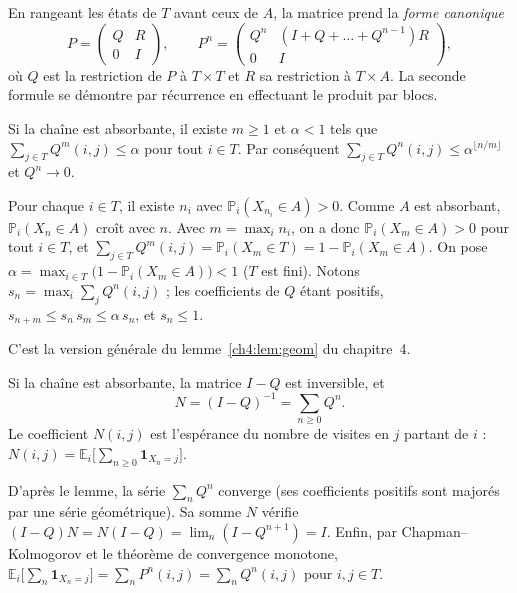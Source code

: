 En rangeant les états de $T$ avant ceux de $A$, la matrice prend la \emph{forme canonique}
\[P=\begin{pmatrix}Q&R\\0&I\end{pmatrix},\qquad P^n=\begin{pmatrix}Q^n&(I+Q+\dots+Q^{n-1})R\\0&I\end{pmatrix},\]
où $Q$ est la restriction de $P$ à $T\times T$ et $R$ sa restriction à $T\times A$. La seconde formule se démontre par
récurrence en effectuant le produit par blocs.

\begin{lemma}\label{appB:lem:geom}
Si la chaîne est absorbante, il existe $m\ge1$ et $\alpha<1$ tels que $\sum_{j\in T}Q^m(i,j)\le\alpha$ pour tout $i\in
T$. Par conséquent $\sum_{j\in T}Q^n(i,j)\le\alpha^{\lfloor n/m\rfloor}$ et $Q^n\to0$.
\end{lemma}

\begin{humanproof}
Pour chaque $i\in T$, il existe $n_i$ avec $\mathbb P_i(X_{n_i}\in A)>0$. Comme $A$ est absorbant, $\mathbb P_i(X_n\in
A)$ croît avec $n$. Avec $m=\max_in_i$, on a donc $\mathbb P_i(X_m\in A)>0$ pour tout $i\in T$, et
$\sum_{j\in T}Q^m(i,j)=\mathbb P_i(X_m\in T)=1-\mathbb P_i(X_m\in A)$. On pose $\alpha=\max_{i\in T}\bigl(1-\mathbb P_i(X_m\in
A)\bigr)<1$ ($T$ est fini). Notons $s_n=\max_i\sum_jQ^n(i,j)$ ; les coefficients de $Q$ étant positifs,
$s_{n+m}\le s_n\,s_m\le\alpha\,s_n$, et $s_n\le1$.
\end{humanproof}

C'est la version générale du lemme~\ref{ch4:lem:geom} du chapitre~4.

\begin{theorem}\label{appB:thm:fond}
Si la chaîne est absorbante, la matrice $I-Q$ est inversible, et
\[N=(I-Q)^{-1}=\sum_{n\ge0}Q^n .\]
Le coefficient $N(i,j)$ est l'espérance du nombre de visites en $j$ partant de $i$ : $N(i,j)=\mathbb
E_i\bigl[\sum_{n\ge0}\mathbf 1_{X_n=j}\bigr]$.
\end{theorem}

\begin{humanproof}
D'après le lemme, la série $\sum_nQ^n$ converge (ses coefficients positifs sont majorés par une série géométrique).
Sa somme $N$ vérifie $(I-Q)N=N(I-Q)=\lim_n(I-Q^{n+1})=I$. Enfin, par Chapman--Kolmogorov et le théorème de
convergence monotone, $\mathbb E_i\bigl[\sum_n\mathbf 1_{X_n=j}\bigr]=\sum_nP^n(i,j)=\sum_nQ^n(i,j)$ pour $i,j\in T$.
\end{humanproof}

